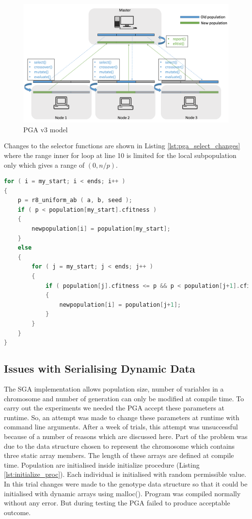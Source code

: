 \begin{figure}[!htb]
        \includegraphics[width= \linewidth]{figs/pga_model_v3.png}
    \caption{PGA v3 model}
     \label{fig:pga_model_v3}
\end{figure}

Changes to the selector functions are shown in Listing \ref{lst:pga_select_changes} where the range inner for loop at line 10 is limited for the local subpopulation only which gives a range of \textit{$(0, n/p)$}.

\begin{lstlisting}[language=C, caption={Changes made in node\_select() procedures.}, label={lst:pga_select_changes}]
for ( i = my_start; i < ends; i++ )
{ 
    p = r8_uniform_ab ( a, b, seed );
    if ( p < population[my_start].cfitness )
    {
        newpopulation[i] = population[my_start];      
    }
    else
    {
        for ( j = my_start; j < ends; j++ )
        { 
            if ( population[j].cfitness <= p && p < population[j+1].cfitness )
            {
                newpopulation[i] = population[j+1];
            }
        }
    }
}
\end{lstlisting}

\subsection{Issues with Serialising Dynamic Data}
The SGA implementation allows population size, number of variables in a chromosome and number of generation can only be modified at compile time. To carry out the experiments we needed the PGA accept these parameters at runtime. So, an attempt was made to change these parameters at runtime with command line arguments. After a week of trials, this attempt was unsuccessful because of a number of reasons which are discussed here. Part of the problem was due to the data structure chosen to represent the chromosome which contains three static array members. The length of these arrays are defined at compile time. Population are initialised inside initialize\(\) procedure (Listing \ref{lst:initialize_proc}). Each individual is initialised with random permissible value. In this trial changes were made to the genotype data structure so that it could be initialised with dynamic arrays using malloc(). Program was compiled normally without any error. But during testing the PGA failed to produce acceptable outcome.

